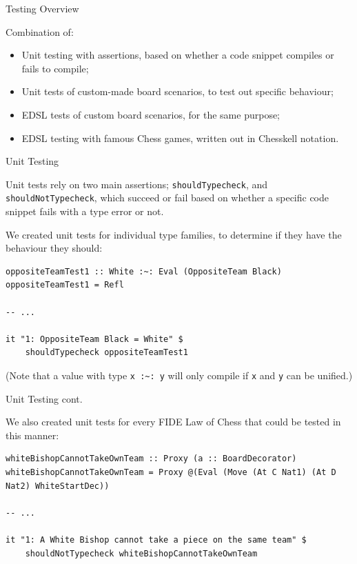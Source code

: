 \documentclass{beamer}
\newcommand{\inline}[1]{\lstinline[basicstyle=\ttfamily]{#1}}
\begin{document}
\begin{frame}{Testing Overview}

Combination of:

\begin{itemize}
    \item Unit testing with assertions, based on whether a code snippet compiles or fails to compile;
    \item Unit tests of custom-made board scenarios, to test out specific behaviour;
    \item EDSL tests of custom board scenarios, for the same purpose;
    \item EDSL testing with famous Chess games, written out in Chesskell notation.
\end{itemize}
    
\end{frame}

\begin{frame}[fragile]{Unit Testing}

Unit tests rely on two main assertions; \inline{shouldTypecheck}, and \inline{shouldNotTypecheck}, which succeed or fail based on whether a specific code snippet fails with a type error or not.

We created unit tests for individual type families, to determine if they have the behaviour they should:

\begin{lstlisting}
oppositeTeamTest1 :: White :~: Eval (OppositeTeam Black)
oppositeTeamTest1 = Refl

-- ...

it "1: OppositeTeam Black = White" $
    shouldTypecheck oppositeTeamTest1
\end{lstlisting}

(Note that a value with type \inline{x :~: y} will only compile if \inline{x} and \inline{y} can be unified.)
    
\end{frame}

\begin{frame}[fragile]{Unit Testing cont.}

We also created unit tests for every FIDE Law of Chess that could be tested in this manner:

\begin{lstlisting}
whiteBishopCannotTakeOwnTeam :: Proxy (a :: BoardDecorator)
whiteBishopCannotTakeOwnTeam = Proxy @(Eval (Move (At C Nat1) (At D Nat2) WhiteStartDec))

-- ...

it "1: A White Bishop cannot take a piece on the same team" $
    shouldNotTypecheck whiteBishopCannotTakeOwnTeam
\end{lstlisting}
    
\end{frame}
\end{document}
